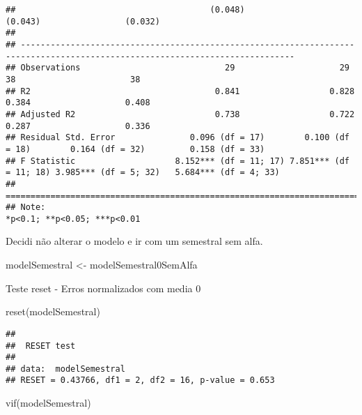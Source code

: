 \documentclass[
]{article}
\newenvironment{Shaded}{\begin{snugshade}}{\end{snugshade}}
\newcommand{\FunctionTok}[1]{\textcolor[rgb]{0.00,0.00,0.00}{#1}}
\newcommand{\NormalTok}[1]{#1}
\newcommand{\OtherTok}[1]{\textcolor[rgb]{0.56,0.35,0.01}{#1}}
\begin{document}
\begin{verbatim}
##                                       (0.048)                                       (0.043)                 (0.032)          
##                                                                                                                              
## -----------------------------------------------------------------------------------------------------------------------------
## Observations                             29                     29                    38                       38            
## R2                                     0.841                  0.828                  0.384                   0.408           
## Adjusted R2                            0.738                  0.722                  0.287                   0.336           
## Residual Std. Error               0.096 (df = 17)        0.100 (df = 18)        0.164 (df = 32)         0.158 (df = 33)      
## F Statistic                    8.152*** (df = 11; 17) 7.851*** (df = 11; 18) 3.985*** (df = 5; 32)   5.684*** (df = 4; 33)   
## =============================================================================================================================
## Note:                                                                                             *p<0.1; **p<0.05; ***p<0.01
\end{verbatim}

Decidi não alterar o modelo e ir com um semestral sem alfa.

\begin{Shaded}
\begin{Highlighting}[]
\NormalTok{modelSemestral }\OtherTok{\textless{}{-}}\NormalTok{ modelSemestral0SemAlfa}
\end{Highlighting}
\end{Shaded}

Teste reset - Erros normalizados com media 0

\begin{Shaded}
\begin{Highlighting}[]
\FunctionTok{reset}\NormalTok{(modelSemestral)}
\end{Highlighting}
\end{Shaded}

\begin{verbatim}
## 
##  RESET test
## 
## data:  modelSemestral
## RESET = 0.43766, df1 = 2, df2 = 16, p-value = 0.653
\end{verbatim}

\begin{Shaded}
\begin{Highlighting}[]
\FunctionTok{vif}\NormalTok{(modelSemestral)}
\end{Highlighting}
\end{Shaded}
\end{document}
